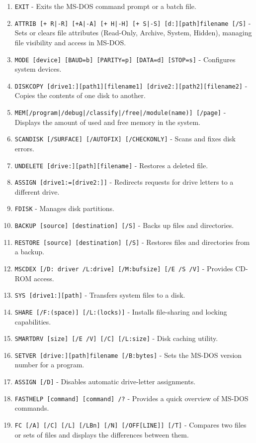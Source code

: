 \begin{enumerate}
    \item \texttt{EXIT} - Exits the MS-DOS command prompt or a batch file.
    \item \texttt{ATTRIB [+ R|-R] [+A|-A] [+ H|-H] [+ S|-S] [d:][path]filename [/S]} - Sets or clears file attributes (Read-Only, Archive, System, Hidden), managing file visibility and access in MS-DOS.
    \item \texttt{MODE [device] [BAUD=b] [PARITY=p] [DATA=d] [STOP=s]} - Configures system devices.
    \item \texttt{DISKCOPY [drive1:][path1][filename1] [drive2:][path2][filename2]} - Copies the contents of one disk to another.
    \item \texttt{MEM[/program|/debug|/classify|/free|/module(name)] [/page]} - Displays the amount of used and free memory in the system.
    \item \texttt{SCANDISK [/SURFACE] [/AUTOFIX] [/CHECKONLY]} - Scans and fixes disk errors.
    \item \texttt{UNDELETE [drive:][path][filename]} - Restores a deleted file.
    \item \texttt{ASSIGN [drive1:=[drive2:]]} - Redirects requests for drive letters to a different drive.
    \item \texttt{FDISK} - Manages disk partitions.
    \item \texttt{BACKUP [source] [destination] [/S]} - Backs up files and directories.
    \item \texttt{RESTORE [source] [destination] [/S]} - Restores files and directories from a backup.
    \item \texttt{MSCDEX [/D: driver /L:drive] [/M:bufsize] [/E /S /V]} - Provides CD-ROM access.
    \item \texttt{SYS [drive1:][path]} - Transfers system files to a disk.
    \item \texttt{SHARE [/F:(space)] [/L:(locks)]} - Installs file-sharing and locking capabilities.
    \item \texttt{SMARTDRV [size] [/E /V] [/C] [/L:size]} - Disk caching utility.
    \item \texttt{SETVER [drive:][path]filename [/B:bytes]} - Sets the MS-DOS version number for a program.
    \item \texttt{ASSIGN [/D]} - Disables automatic drive-letter assignments.
    \item \texttt{FASTHELP [command] [command] /?} - Provides a quick overview of MS-DOS commands.
    \item \texttt{FC [/A] [/C] [/L] [/LBn] [/N] [/OFF[LINE]] [/T]} - Compares two files or sets of files and displays the differences between them.

\end{enumerate}
